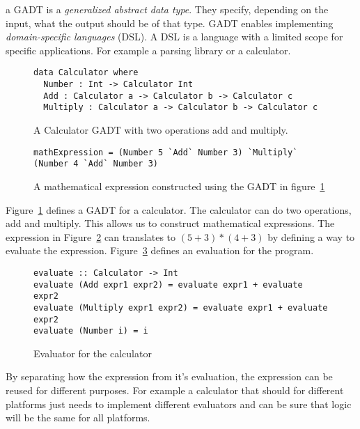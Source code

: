 a GADT is a \textit{generalized abstract data type}.  They specify, depending on
the input, what the output should be of that type. GADT enables implementing
\textit{domain-specific languages} (DSL). A DSL is a language with a limited
scope for specific applications. For example a parsing library or a calculator.

\begin{figure}[H]
    \begin{lstlisting}
data Calculator where 
  Number : Int -> Calculator Int
  Add : Calculator a -> Calculator b -> Calculator c
  Multiply : Calculator a -> Calculator b -> Calculator c
    \end{lstlisting}
    \caption{A Calculator GADT with two operations add and multiply.}
    \label{gadtcalculator}
\end{figure}

\begin{figure}[H]
    \begin{lstlisting}
mathExpression = (Number 5 `Add` Number 3) `Multiply` (Number 4 `Add` Number 3)
    \end{lstlisting}
    \caption{A mathematical expression constructed using the GADT in
    figure~\ref{gadtcalculator}}
    \label{mathexpressiongadt}
\end{figure}


Figure~\ref{gadtcalculator} defines a GADT for a calculator. The calculator can
do two operations, add and multiply. This allows us to construct mathematical
expressions. The expression in Figure~\ref{mathexpressiongadt} can translates to
$(5+3)*(4+3)$ by defining a way to evaluate the expression.
Figure~\ref{calculator} defines an evaluation for the program.

\begin{figure}[H]
    \begin{lstlisting}
evaluate :: Calculator -> Int
evaluate (Add expr1 expr2) = evaluate expr1 + evaluate expr2
evaluate (Multiply expr1 expr2) = evaluate expr1 + evaluate expr2
evaluate (Number i) = i
    \end{lstlisting}
    \caption{Evaluator for the calculator}
    \label{calculator}
\end{figure}

By separating how the expression from it's evaluation, the expression can be
reused for different purposes. For example a calculator that should for
different platforms just needs to implement different evaluators and can be sure
that logic will be the same for all platforms.

